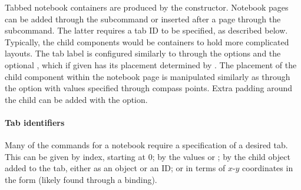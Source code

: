 Tabbed notebook containers are produced by the
 constructor.  Notebook pages can be added
through the  subcommand or inserted after
a page through the  subcommand. The
latter requires a tab ID to be specified, as described below.
Typically, the child components would be containers to hold more
complicated layouts. The tab label is configured similarly to
 through the options  and
the optional , which if given has its
placement determined by .  The placement
of the child component within the notebook page is manipulated
similarly as  through the
 option with values specified through
compass points. Extra padding around the child can be added with the
 option.

\paragraph{Tab identifiers} %
Many of the commands for a notebook require a specification of a
desired tab. This can be given by index, starting at 0; by the values
 or ; by the child object added to the
tab, either as an \R\/ object or an ID; or in terms of $x$-$y$
coordinates in the form  (likely found through a
binding).

